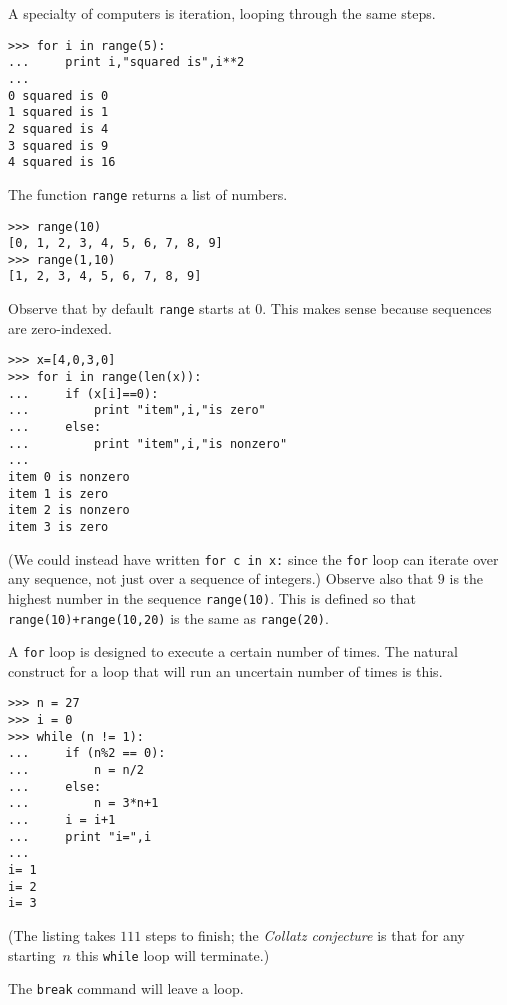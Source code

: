 A specialty of computers is iteration, looping through the same steps.
\begin{lstlisting}[style=python]
>>> for i in range(5):
...     print i,"squared is",i**2
... 
0 squared is 0
1 squared is 1
2 squared is 4
3 squared is 9
4 squared is 16
\end{lstlisting}
The function \lstinline[style=inline]!range! returns a list of numbers.
\begin{lstlisting}[style=python]
 >>> range(10)
[0, 1, 2, 3, 4, 5, 6, 7, 8, 9]
>>> range(1,10)
[1, 2, 3, 4, 5, 6, 7, 8, 9] 
\end{lstlisting}
Observe that by default \lstinline[style=inline]!range! starts at $0$.
This makes sense because sequences are zero-indexed.
\begin{lstlisting}[style=python]
>>> x=[4,0,3,0]
>>> for i in range(len(x)):
...     if (x[i]==0):
...         print "item",i,"is zero"
...     else:
...         print "item",i,"is nonzero"
... 
item 0 is nonzero
item 1 is zero
item 2 is nonzero
item 3 is zero  
\end{lstlisting}
(We could instead have written \lstinline[style=inline]!for c in x:! since
the \lstinline[style=inline]!for! loop can iterate over any sequence, not just
over a sequence of integers.) 
Observe also that $9$ is the highest number in the sequence 
\lstinline[style=inline]!range(10)!.
This is defined so that \lstinline[style=inline]!range(10)+range(10,20)! is the
same as \lstinline[style=inline]!range(20)!.

A \lstinline[style=inline]!for! loop is designed to execute a certain
number of times.
The natural construct for a loop that will run an uncertain number of times
is this.
\begin{lstlisting}[style=python]
>>> n = 27
>>> i = 0
>>> while (n != 1):
...     if (n%2 == 0):
...         n = n/2
...     else:
...         n = 3*n+1
...     i = i+1
...     print "i=",i
... 
i= 1
i= 2
i= 3  
\end{lstlisting}
(The listing takes $111$ steps to finish; the \textit{Collatz conjecture} is 
that for any starting~$n$ this \lstinline[style=inline]!while! loop will 
terminate.)

The \lstinline[style=inline]!break! command will leave a loop.



